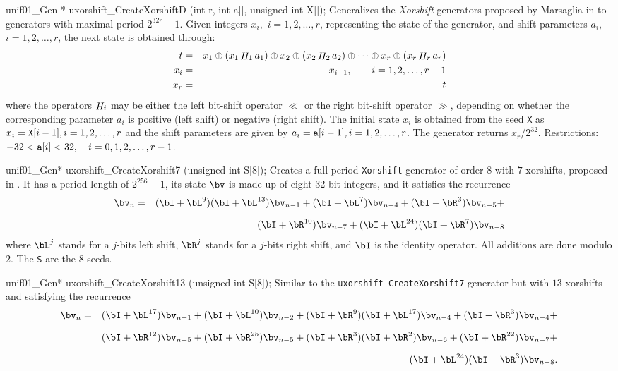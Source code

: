 unif01_Gen * uxorshift_CreateXorshiftD (int r, int a[], unsigned int X[]);
\endcode
 \tab Generalizes the {\it Xorshift} generators
  proposed by Marsaglia in \cite[page 5]{rMAR03a} to generators
  with maximal period  $2^{32r} - 1$.
  Given integers $x_i$,\  $i = 1,2,\ldots, r$,
   representing the state of the generator, and shift parameters
   $a_i$,\  $i = 1,2,\ldots, r$, the next
  state is obtained through:
  \begin {eqnarray*}
    t  &= & x_1 \oplus (x_1 \mathop {H}\nolimits_1 a_1) \oplus x_2 \oplus (x_2 \mathop {H}\nolimits_2 a_2) 
   \oplus \cdots  \oplus x_r \oplus (x_r \mathop {H}\nolimits_r a_r)  \\
    x_i &=& x_{i+1}, \qquad i = 1,2,\ldots, r-1 \\
    x_r   &=& t
  \end {eqnarray*}
   where the operators $\mathop {H}\nolimits_i$ may be either
   the left bit-shift  operator $\ll$ or the right bit-shift operator $\gg$,
   depending on whether the corresponding parameter $a_i$ 
   is positive (left shift) or  negative (right shift).
   The initial state $x_i$ is obtained from the seed {\tt X}  as
    $x_i = {\tt X} [i - 1],   i = 1,2,\ldots, r$ and the shift parameters are
   given by $a_i = {\tt a}[i - 1],   i = 1,2,\ldots, r$.
   The generator returns $x_{r}/2^{32}$.
   Restrictions: $-32 < {\tt a}[i] < 32, \quad i = 0, 1,2,\ldots, r-1 $.
  \endtab
\code


unif01_Gen* uxorshift_CreateXorshift7 (unsigned int S[8]);
\endcode
  \tab Creates a full-period \texttt{Xorshift} generator%
  of  order $8$ with $7$ xorshifts, proposed in \cite{rPAN04c}. 
  It has a period length of
  $2^{256}-1$, its state $\bv$ is made up of eight 32-bit integers, and it
   satisfies the recurrence
\begin{eqnarray*}
\bv_{n} &=& (\bI + \bL^9)(\bI + \bL^{13})\bv_{n-1}
+ (\bI+\bL^{7})\bv_{n-4}  + (\bI+\bR^{3})\bv_{n-5} + \\[6pt]
 &&  (\bI+\bR^{10})\bv_{n-7} + 
(\bI+\bL^{24})(\bI+\bR^{7})\bv_{n-8}
\end{eqnarray*}
 where $\bL^j$ stands for a $j$-bits left shift, $\bR^j$ stands for
  a $j$-bits right shift, and $\bI$ is the identity operator. All additions
are done modulo 2.
 The \texttt{S} are the 8 seeds.
 \endtab
\code


unif01_Gen* uxorshift_CreateXorshift13 (unsigned int S[8]);
\endcode
  \tab Similar to the \texttt{uxorshift\_CreateXorshift7} generator
  \cite{rPAN04c}%
  but  with $13$ xorshifts and  satisfying the recurrence
\begin{eqnarray*}
\bv_{n} &=& (\bI+\bL^{17})\bv_{n-1}
+(\bI+\bL^{10})\bv_{n-2}
+(\bI+\bR^{9})(\bI+\bL^{17})\bv_{n-4}
+ (\bI+\bR^{3})\bv_{n-4} + \\[6pt] 
 &&  (\bI+\bR^{12})\bv_{n-5}
+ (\bI+\bR^{25})\bv_{n-5} 
+  (\bI+\bR^{3})(\bI+\bR^{2})\bv_{n-6}
+(\bI+\bR^{22})\bv_{n-7} + \\[6pt] 
 && (\bI+\bL^{24})(\bI+\bR^{3})\bv_{n-8}.
\end{eqnarray*}
 \endtab


